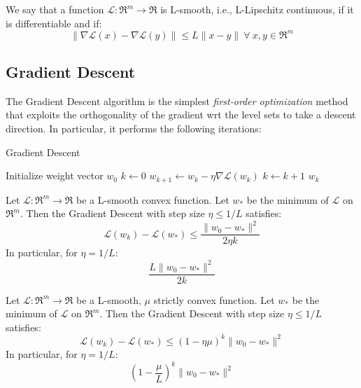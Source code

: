 \begin{definition}[L-smoothness]
We say that a function $\mathcal{L}: \Re^m \rightarrow \Re$ is L-smooth, i.e., L-Lipschitz continuous, if it is differentiable and if:
$$
\| \nabla \mathcal{L}(x) - \nabla \mathcal{L}(y) \| \leq L \| x - y \| \ \forall \ x, y \in \Re^m
$$
\end{definition}

\subsection{Gradient Descent}

The Gradient Descent algorithm is the simplest \emph{first-order optimization} method that exploits the orthogonality of the gradient wrt the level sets to take a descent direction. In particular, it performs the following iterations:

\begin{algorithm}[H]
	\caption{Gradient Descent}
	\label{alg:gd}
	\begin{algorithmic}
			\State Initialize weight vector $w_0$
			\State $k \gets 0$
				\State $w_{k+1} \gets w_k - \eta \nabla \mathcal{L}(w_k)$
				\State $k \gets k + 1$
			\EndWhile
			\State \Return $w_k$
		\EndFunction
	\end{algorithmic}
\end{algorithm}

\begin{theorem}
Let $\mathcal{L}: \Re^m \rightarrow \Re$ be a L-smooth convex function. Let $w_*$ be the minimum of $\mathcal{L}$ on $\Re^m$. Then the Gradient Descent with step size $\eta \leq 1/L$ satisfies:
$$
\mathcal{L}(w_k) - \mathcal{L}(w_*) \leq \frac{\| w_0 - w_* \|^2}{2 \eta k}
$$
In particular, for $\eta = 1/L$:
$$
\frac{L \| w_0 - w_* \|^2}{2 k}
$$
\end{theorem}

\begin{theorem}
Let $\mathcal{L}: \Re^m \rightarrow \Re$ be a L-smooth, $\mu$ strictly convex function. Let $w_*$ be the minimum of $\mathcal{L}$ on $\Re^m$. Then the Gradient Descent with step size $\eta \leq 1/L$ satisfies:
$$
\mathcal{L}(w_k) - \mathcal{L}(w_*) \leq (1 - \eta \mu)^k \| w_0 - w_* \|^2
$$
In particular, for $\eta = 1/L$:
$$
(1 - \frac{\mu}{L})^k \| w_0 - w_* \|^2
$$
\end{theorem}

